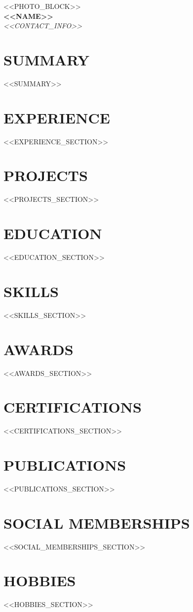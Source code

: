 \documentclass[<<FONT_SIZE>>,a4paper]{article}
\begin{document}
\begin{center}
    <<PHOTO_BLOCK>> \\
    \vspace{2mm}
    {\Huge \textbf{\textsc{<<NAME>>}}} \\
    \vspace{1.5mm}
    \textit{<<CONTACT_INFO>>}
\end{center}

\vspace{4mm}

\section*{SUMMARY}
<<SUMMARY>>

\section*{EXPERIENCE}
<<EXPERIENCE_SECTION>>

\section*{PROJECTS}
<<PROJECTS_SECTION>>

\section*{EDUCATION}
<<EDUCATION_SECTION>>

\section*{SKILLS}
<<SKILLS_SECTION>>

\section*{AWARDS}
<<AWARDS_SECTION>>

\section*{CERTIFICATIONS}
<<CERTIFICATIONS_SECTION>>

\section*{PUBLICATIONS}
<<PUBLICATIONS_SECTION>>

\section*{SOCIAL MEMBERSHIPS}
<<SOCIAL_MEMBERSHIPS_SECTION>>

\section*{HOBBIES}
<<HOBBIES_SECTION>>
\end{document}
